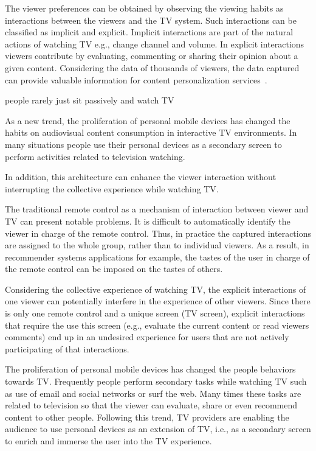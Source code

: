 \documentclass[conference,a4paper]{IEEEtran}
\begin{document}
The viewer preferences can be obtained by observing the viewing habits as interactions between the viewers and the TV system. Such interactions can be classified as implicit and explicit. Implicit interactions are part of the natural actions of watching TV e.g., change channel and volume. In explicit interactions viewers contribute by evaluating, commenting or sharing their opinion about a given content. Considering the data of thousands of viewers, the data captured can provide valuable information for content personalization services~\cite{Teixeira2010}.


people rarely just sit passively and watch TV

As a new trend, the proliferation of personal mobile devices has changed the habits on audiovisual content consumption in interactive TV environments. In many situations people use their personal devices as a secondary screen to perform activities related to television watching.

In addition, this architecture can enhance the viewer interaction without interrupting the collective experience while watching TV. 

The traditional remote control as a mechanism of interaction between viewer and TV can present notable problems. It is difficult to automatically identify the viewer in charge of the remote control. Thus, in practice the captured interactions are assigned to the whole group, rather than to individual viewers. As a result, in recommender systems applications for example, the tastes of the user in charge of the remote control can be imposed on the tastes of others.

Considering the collective experience of watching TV, the explicit interactions of one viewer can potentially interfere in the experience of other viewers. Since there is only one remote control and a unique screen (TV screen), explicit interactions that require the use this screen (e.g., evaluate the current content or read viewers comments) end up in an undesired experience for users that are not actively participating of that interactions.

The proliferation of personal mobile devices has changed the people behaviors towards TV. Frequently people perform secondary tasks while watching TV such as use of email and social networks or surf the web. Many times these tasks are related to television so that the viewer can evaluate, share or even recommend content to other people. Following this trend, TV providers are enabling the audience to use personal devices as an extension of TV, i.e., as a secondary screen to enrich and immerse the user into the TV experience.
\end{document}
